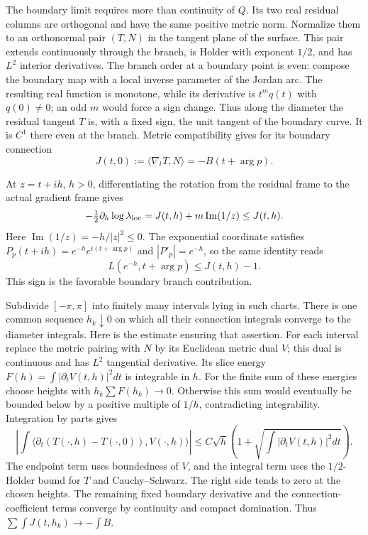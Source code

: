 The boundary limit requires more than continuity of $Q$.  Its two
real residual columns are orthogonal and have the same positive
metric norm.  Normalize them to an orthonormal pair $(T,N)$ in the
tangent plane of the surface.  This pair extends continuously
through the branch, is Holder with exponent $1/2$, and has $L^2$
interior derivatives.  The branch order at a boundary point is
even: compose the boundary map with a local inverse parameter of
the Jordan arc.  The resulting real function is monotone, while
its derivative is $t^m q(t)$ with $q(0)\ne0$; an odd $m$ would
force a sign change.  Thus along the diameter the residual tangent
$T$ is, with a fixed sign, the unit tangent of the boundary curve.
It is $C^1$ there even at the branch.  Metric compatibility gives
for its boundary connection
\[
 J(t,0):=\langle\nabla_tT,N\rangle=-B(t+\arg p).
\]

At $z=t+ih$, $h>0$, differentiating the rotation from the residual
frame to the actual gradient frame gives
\[
 -\tfrac12\partial_h\log\lambda_{\rm loc}
       =J(t,h)+m\operatorname{Im}(1/z)\le J(t,h).
\]
Here $\operatorname{Im}(1/z)=-h/|z|^2\le0$.
The exponential coordinate satisfies
$P_p(t+ih)=e^{-h}e^{i(t+\arg p)}$ and $|P'_p|=e^{-h}$,
so the same identity reads
\begin{equation}
 L(e^{-h},t+\arg p)\le J(t,h)-1.
 \label{eq:annular-boundary-radial}
\end{equation}
This sign is the favorable boundary branch contribution.

Subdivide $[-\pi,\pi]$ into finitely many intervals lying in such
charts.  There is one common sequence $h_k\downarrow0$ on which
all their connection integrals converge to the diameter integrals.
Here is the estimate ensuring that assertion.  For each interval
replace the metric pairing with $N$ by its Euclidean metric dual
$V$; this dual is continuous and has $L^2$ tangential derivative.
Its slice energy $F(h)=\int|\partial_tV(t,h)|^2dt$ is integrable
in $h$.  For the finite sum of these energies choose heights with
$h_k\sum F(h_k)\to0$.  Otherwise this sum would eventually be
bounded below by a positive multiple of $1/h$, contradicting
integrability.  Integration by parts gives
\[
 \left|\int\langle\partial_t(T(\cdot,h)-T(\cdot,0)),
                                  V(\cdot,h)\rangle\right|
 \le C\sqrt h\left(1+\sqrt{\int|\partial_tV(t,h)|^2dt}\right).
\]
The endpoint term uses boundedness of $V$, and the integral term
uses the $1/2$-Holder bound for $T$ and Cauchy--Schwarz.  The
right side tends to zero at the chosen heights.  The remaining
fixed boundary derivative and the connection-coefficient terms
converge by continuity and compact domination.  Thus
$\sum\int J(t,h_k)\to-\int B$.

